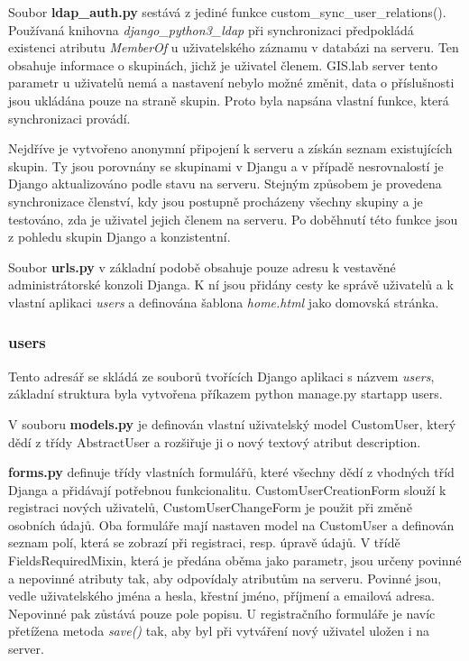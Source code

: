 Soubor \textbf{ldap\_auth.py} sestává z jediné funkce
\textsf{custom\_sync\_user\_relations()}. Používaná knihovna
\textit{django\_python3\_ldap} při synchronizaci předpokládá existenci
atributu \textit{MemberOf} u uživatelského záznamu v databázi na
 serveru. Ten obsahuje informace o skupinách, jichž je
uživatel členem. GIS.lab server tento parametr u uživatelů nemá a
nastavení nebylo možné změnit, data o příslušnosti jsou ukládána pouze
na straně skupin. Proto byla napsána vlastní funkce, která
synchronizaci provádí.

Nejdříve je vytvořeno anonymní připojení k  serveru a získán
seznam existujících skupin. Ty jsou porovnány se skupinami v Djangu a
v případě nesrovnalostí je Django aktualizováno podle stavu na
 serveru. Stejným způsobem je provedena synchronizace
členství, kdy jsou postupně procházeny všechny skupiny a je testováno,
zda je uživatel jejich členem na  serveru. Po doběhnutí této
funkce jsou z pohledu skupin Django a  konzistentní.

Soubor \textbf{urls.py} v základní podobě obsahuje pouze 
adresu k vestavěné administrátorské konzoli Djanga. K ní jsou přidány
cesty ke správě uživatelů a k vlastní aplikaci \textit{users} a
definována šablona \textit{home.html} jako domovská stránka.

\subsubsection{users}

Tento adresář se skládá ze souborů tvořících Django aplikaci s názvem
\textit{users}, základní struktura byla vytvořena příkazem
\textsf{python manage.py startapp users}.

V souboru \textbf{models.py} je definován vlastní uživatelský model
\textsf{CustomUser}, který dědí z třídy \textsf{AbstractUser} a
rozšiřuje ji o nový textový atribut \textsf{description}.

\textbf{forms.py} definuje třídy vlastních formulářů, které všechny
dědí z vhodných tříd Djanga a přidávají potřebnou
funkcionalitu. \textsf{CustomUserCreationForm} slouží k registraci
nových uživatelů, \textsf{CustomUserChangeForm} je použit při změně
osobních údajů. Oba formuláře mají nastaven model na
\textsf{CustomUser} a definován seznam polí, která se zobrazí při
registraci, resp. úpravě údajů. V třídě \textsf{FieldsRequiredMixin},
která je předána oběma jako parametr, jsou určeny povinné a nepovinné
atributy tak, aby odpovídaly atributům na  serveru. Povinné
jsou, vedle uživatelského jména a hesla, křestní jméno, příjmení a
emailová adresa. Nepovinné pak zůstává pouze pole popisu. U
registračního formuláře je navíc přetížena metoda \textit{save()} tak,
aby byl při vytváření nový uživatel uložen i na  server.

